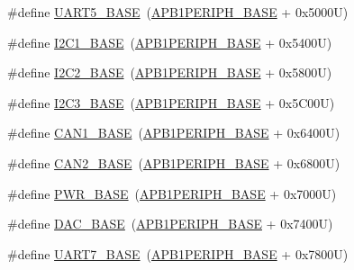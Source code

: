 \begin{DoxyCompactItemize}
\item 
\#define \hyperlink{group___peripheral__memory__map_gaa155689c0e206e6994951dc3cf31052a}{U\+A\+R\+T5\+\_\+\+B\+A\+SE}~(\hyperlink{group___peripheral__memory__map_ga45666d911f39addd4c8c0a0ac3388cfb}{A\+P\+B1\+P\+E\+R\+I\+P\+H\+\_\+\+B\+A\+SE} + 0x5000\+U)
\item 
\#define \hyperlink{group___peripheral__memory__map_gacd72dbffb1738ca87c838545c4eb85a3}{I2\+C1\+\_\+\+B\+A\+SE}~(\hyperlink{group___peripheral__memory__map_ga45666d911f39addd4c8c0a0ac3388cfb}{A\+P\+B1\+P\+E\+R\+I\+P\+H\+\_\+\+B\+A\+SE} + 0x5400\+U)
\item 
\#define \hyperlink{group___peripheral__memory__map_ga04bda70f25c795fb79f163b633ad4a5d}{I2\+C2\+\_\+\+B\+A\+SE}~(\hyperlink{group___peripheral__memory__map_ga45666d911f39addd4c8c0a0ac3388cfb}{A\+P\+B1\+P\+E\+R\+I\+P\+H\+\_\+\+B\+A\+SE} + 0x5800\+U)
\item 
\#define \hyperlink{group___peripheral__memory__map_ga4e8b9198748235a1729e1e8f8f24983b}{I2\+C3\+\_\+\+B\+A\+SE}~(\hyperlink{group___peripheral__memory__map_ga45666d911f39addd4c8c0a0ac3388cfb}{A\+P\+B1\+P\+E\+R\+I\+P\+H\+\_\+\+B\+A\+SE} + 0x5\+C00\+U)
\item 
\#define \hyperlink{group___peripheral__memory__map_gad8e45ea6c032d9fce1b0516fff9d8eaa}{C\+A\+N1\+\_\+\+B\+A\+SE}~(\hyperlink{group___peripheral__memory__map_ga45666d911f39addd4c8c0a0ac3388cfb}{A\+P\+B1\+P\+E\+R\+I\+P\+H\+\_\+\+B\+A\+SE} + 0x6400\+U)
\item 
\#define \hyperlink{group___peripheral__memory__map_gaf7b8267b0d439f8f3e82f86be4b9fba1}{C\+A\+N2\+\_\+\+B\+A\+SE}~(\hyperlink{group___peripheral__memory__map_ga45666d911f39addd4c8c0a0ac3388cfb}{A\+P\+B1\+P\+E\+R\+I\+P\+H\+\_\+\+B\+A\+SE} + 0x6800\+U)
\item 
\#define \hyperlink{group___peripheral__memory__map_gac691ec23dace8b7a649a25acb110217a}{P\+W\+R\+\_\+\+B\+A\+SE}~(\hyperlink{group___peripheral__memory__map_ga45666d911f39addd4c8c0a0ac3388cfb}{A\+P\+B1\+P\+E\+R\+I\+P\+H\+\_\+\+B\+A\+SE} + 0x7000\+U)
\item 
\#define \hyperlink{group___peripheral__memory__map_gad18d0b914c7f68cecbee1a2d23a67d38}{D\+A\+C\+\_\+\+B\+A\+SE}~(\hyperlink{group___peripheral__memory__map_ga45666d911f39addd4c8c0a0ac3388cfb}{A\+P\+B1\+P\+E\+R\+I\+P\+H\+\_\+\+B\+A\+SE} + 0x7400\+U)
\item 
\#define \hyperlink{group___peripheral__memory__map_ga3150e4b10ec876c0b20f22de12a8fa40}{U\+A\+R\+T7\+\_\+\+B\+A\+SE}~(\hyperlink{group___peripheral__memory__map_ga45666d911f39addd4c8c0a0ac3388cfb}{A\+P\+B1\+P\+E\+R\+I\+P\+H\+\_\+\+B\+A\+SE} + 0x7800\+U)

\end{DoxyCompactItemize}
